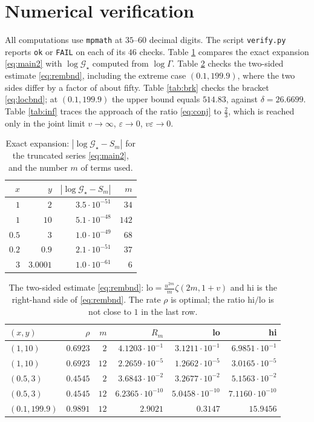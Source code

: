 \documentclass[11pt,a4paper]{amsart}
\theoremstyle{definition}
\newcommand{\Gs}{\mathcal{G}_{\star}}
\newcommand{\eps}{\varepsilon}
\begin{document}
\section{Numerical verification}\label{sec:num}

All computations use \texttt{mpmath} at $35$--$60$ decimal digits.
The script \texttt{verify.py} reports \texttt{ok} or \texttt{FAIL} on each of its $46$ checks.
Table \ref{tab:exp} compares the exact expansion \eqref{eq:main2} with $\log\Gs$ computed
from $\log\Gamma$. Table \ref{tab:rem} checks the two-sided estimate \eqref{eq:rembnd},
including the extreme case $(0.1,199.9)$, where the two sides differ by a factor of about
fifty. Table \ref{tab:brk} checks the bracket \eqref{eq:locbnd}; at $(0.1,199.9)$ the
upper bound equals $514.83$, against $\delta=26.6699$. Table \ref{tab:inf} traces the
approach of the ratio \eqref{eq:conj} to $\frac23$, which is reached only in the joint
limit $v\to\infty$, $\eps\to0$, $v\eps\to0$.

\begin{table}[htbp]\centering\small
\caption{Exact expansion: $|\log\Gs-S_m|$ for the truncated series \eqref{eq:main2}, and
the number $m$ of terms used.}
\label{tab:exp}
\begin{tabular}{rrrr}
\toprule
$x$ & $y$ & $|\log\Gs-S_{m}|$ & $m$\\
\midrule
$1$ & $2$ & $3.5\cdot10^{-51}$ & $34$\\
$1$ & $10$ & $5.1\cdot10^{-48}$ & $142$\\
$0.5$ & $3$ & $1.0\cdot10^{-49}$ & $68$\\
$0.2$ & $0.9$ & $2.1\cdot10^{-51}$ & $37$\\
$3$ & $3.0001$ & $1.0\cdot10^{-61}$ & $6$\\
\bottomrule
\end{tabular}
\end{table}

\begin{table}[htbp]\centering\small
\caption{The two-sided estimate \eqref{eq:rembnd}: $\mathrm{lo}=\frac{u^{2m}}{m}\zeta(2m,1+v)$
and $\mathrm{hi}$ is the right-hand side of \eqref{eq:rembnd}. The rate $\rho$ is optimal;
the ratio $\mathrm{hi}/\mathrm{lo}$ is not close to $1$ in the last row.}
\label{tab:rem}
\begin{tabular}{lrrrrr}
\toprule
$(x,y)$ & $\rho$ & $m$ & $R_m$ & lo & hi\\
\midrule
$(1,10)$ & $0.6923$ & $2$ & $4.1203\cdot10^{-1}$ & $3.1211\cdot10^{-1}$ & $6.9851\cdot10^{-1}$\\
$(1,10)$ & $0.6923$ & $12$ & $2.2659\cdot10^{-5}$ & $1.2662\cdot10^{-5}$ & $3.0165\cdot10^{-5}$\\
$(0.5,3)$ & $0.4545$ & $2$ & $3.6843\cdot10^{-2}$ & $3.2677\cdot10^{-2}$ & $5.1563\cdot10^{-2}$\\
$(0.5,3)$ & $0.4545$ & $12$ & $6.2365\cdot10^{-10}$ & $5.0458\cdot10^{-10}$ & $7.1160\cdot10^{-10}$\\
$(0.1,199.9)$ & $0.9891$ & $12$ & $2.9021$ & $0.3147$ & $15.9456$\\
\bottomrule
\end{tabular}
\end{table}
\end{document}
